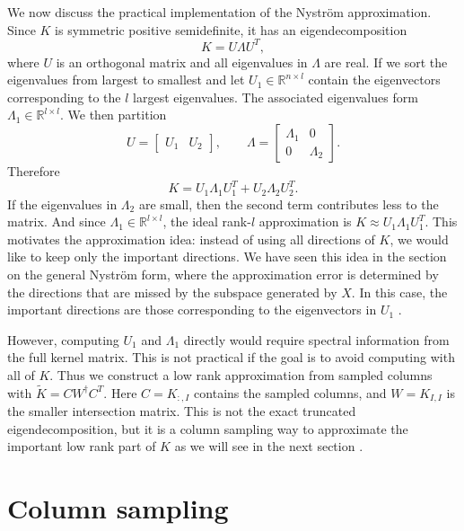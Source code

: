 We now discuss the practical implementation of the Nystr\"om approximation. Since $K$ is symmetric positive semidefinite, it has an eigendecomposition
\[
K=U\Lambda U^T,
\] where $U$ is an orthogonal matrix and all eigenvalues in $\Lambda$ are real. If we sort the eigenvalues from largest to smallest and let $U_1\in\mathbb{R}^{n\times l}$ contain the eigenvectors corresponding
to the $l$ largest eigenvalues. The associated eigenvalues form $\Lambda_1\in\mathbb{R}^{l\times l}$. We then partition
\[
U=
\begin{bmatrix}
U_1 & U_2
\end{bmatrix},
\qquad
\Lambda=
\begin{bmatrix}
\Lambda_1 & 0\\
0 & \Lambda_2
\end{bmatrix}.
\]
Therefore
\[
K=U_1\Lambda_1U_1^T+U_2\Lambda_2U_2^T.
\]
If the eigenvalues in $\Lambda_2$ are small, then the second term contributes less to the matrix. And since $\Lambda_1 \in \mathbb{R}^{l\times l}$, the ideal rank-$l$ approximation is $K\approx U_1\Lambda_1U_1^T$. This motivates the approximation idea: instead of using all directions of $K$, we would like to keep only the important directions. We have seen this idea in the section on the general Nystr\"om form, where the approximation error is determined by the directions that are missed by the subspace generated by $X$. In this case, the important directions are those corresponding to the eigenvectors in $U_1$ \citep{eckart1936approximation}.

However, computing $U_1$ and $\Lambda_1$ directly would require spectral information from the full kernel matrix. This is not practical if the goal is to avoid computing with all of $K$. Thus we construct a low rank approximation from sampled columns with $\tilde K=CW^\dagger C^T.$ Here $C=K_{:,I}$ contains the sampled columns, and $W=K_{I,I}$ is the smaller intersection matrix. This is not the exact truncated eigendecomposition, but it is a column sampling way to approximate the important low rank part of $K$ as we will see in the next section \citep{williams2000using,drineas2005nystrom,kumar2012sampling,gittens2016revisiting,musco2017recursive}.

\section{Column sampling}

